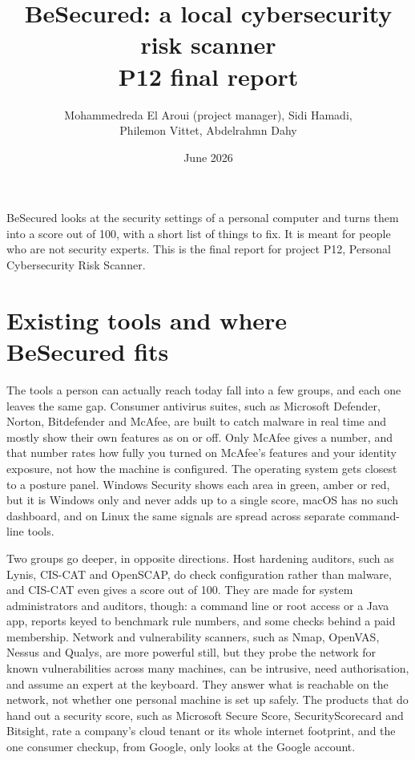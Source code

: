 \documentclass[11pt,a4paper]{article}
\title{\vspace{-8mm}BeSecured: a local cybersecurity risk scanner\\[3pt]
  \large P12 final report}
\author{Mohammedreda El Aroui (project manager), Sidi Hamadi,\\
  Philemon Vittet, Abdelrahmn Dahy}
\date{June 2026}
\begin{document}
\maketitle

BeSecured looks at the security settings of a personal computer and turns them
into a score out of 100, with a short list of things to fix. It is meant for
people who are not security experts. This is the final report for project P12,
Personal Cybersecurity Risk Scanner.

\section{Existing tools and where BeSecured fits}

The tools a person can actually reach today fall into a few groups, and each one
leaves the same gap. Consumer antivirus suites, such as Microsoft Defender,
Norton, Bitdefender and McAfee, are built to catch malware in real time and
mostly show their own features as on or off. Only McAfee gives a number, and that
number rates how fully you turned on McAfee's features and your identity
exposure, not how the machine is configured. The operating system gets closest to
a posture panel. Windows Security shows each area in green, amber or red, but it
is Windows only and never adds up to a single score, macOS has no such dashboard,
and on Linux the same signals are spread across separate command-line tools.

Two groups go deeper, in opposite directions. Host hardening auditors, such as
Lynis, CIS-CAT and OpenSCAP, do check configuration rather than malware, and
CIS-CAT even gives a score out of 100. They are made for system administrators
and auditors, though: a command line or root access or a Java app, reports keyed
to benchmark rule numbers, and some checks behind a paid membership. Network and
vulnerability scanners, such as Nmap, OpenVAS, Nessus and Qualys, are more
powerful still, but they probe the network for known vulnerabilities across many
machines, can be intrusive, need authorisation, and assume an expert at the
keyboard. They answer what is reachable on the network, not whether one personal
machine is set up safely. The products that do hand out a security score, such as
Microsoft Secure Score, SecurityScorecard and Bitsight, rate a company's cloud
tenant or its whole internet footprint, and the one consumer checkup, from
Google, only looks at the Google account.
\end{document}
